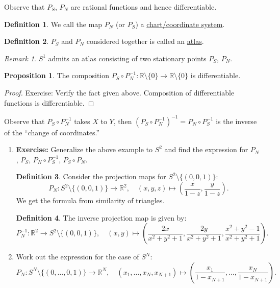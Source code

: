 \documentclass[11pt]{article}
\theoremstyle{definition}
\newtheorem{definition}{Definition}[section]
\newtheorem{proposition}{Proposition}[section]
\theoremstyle{remark}
\newtheorem{remark}{Remark}[section]
\begin{document}
Observe that $P_S$, $P_N$ are rational functions and hence differentiable.

\begin{definition}\label{def:chart_coord}
We call the map $P_N$ (or $P_S$) a \underline{chart/coordinate system}.
\end{definition}

\begin{definition}\label{def:atlas}
$P_S$ and $P_N$ considered together is called an \underline{atlas}.
\end{definition}

\begin{remark}\label{rem:atlas_sphere}
$S^1$ admits an atlas consisting of two stationary points $P_S$, $P_N$.
\end{remark}

\begin{proposition}\label{prop:composition_diff}
The composition $P_S \circ P_N^{-1} : \mathbb{R} \setminus \{0\} \to \mathbb{R} \setminus \{0\}$ is differentiable.
\end{proposition}

\begin{proof}
Exercise: Verify the fact given above. Composition of differentiable functions is differentiable.
\end{proof}

Observe that $P_S \circ P_N^{-1}$ takes $X$ to $Y$, then $(P_S \circ P_N^{-1})^{-1} = P_N \circ P_S^{-1}$ is the inverse of the ``change of coordinates.''

\begin{enumerate}
    \item \textbf{Exercise:} Generalize the above example to $S^2$ and find the expression for $P_N$, $P_S$, $P_N \circ P_S^{-1}$, $P_S \circ P_N$.

    \begin{definition}\label{def:projection_s2}
        Consider the projection maps for $S^2 \setminus \{(0,0,1)\}$:
        \[
        P_N : S^2 \setminus \{(0,0,1)\} \to \mathbb{R}^2, \quad (x,y,z) \mapsto \left(\frac{x}{1-z}, \frac{y}{1-z}\right).
        \]
        We get the formula from similarity of triangles.
    \end{definition}

    \begin{definition}\label{def:inverse_projection_s2}
        The inverse projection map is given by:
        \[
        P_N^{-1} : \mathbb{R}^2 \to S^2 \setminus \{(0,0,1)\}, \quad (x,y) \mapsto \left(\frac{2x}{x^2 + y^2 + 1}, \frac{2y}{x^2 + y^2 + 1}, \frac{x^2 + y^2 - 1}{x^2 + y^2 + 1}\right).
        \]
    \end{definition}

    \item Work out the expression for the case of $S^N$:
    \[
    P_N : S^N \setminus \{(0, \dots, 0, 1)\} \to \mathbb{R}^N, \quad (x_1, \dots, x_N, x_{N+1}) \mapsto \left(\frac{x_1}{1-x_{N+1}}, \dots, \frac{x_N}{1-x_{N+1}}\right).
    \]
\end{enumerate}
\end{document}
